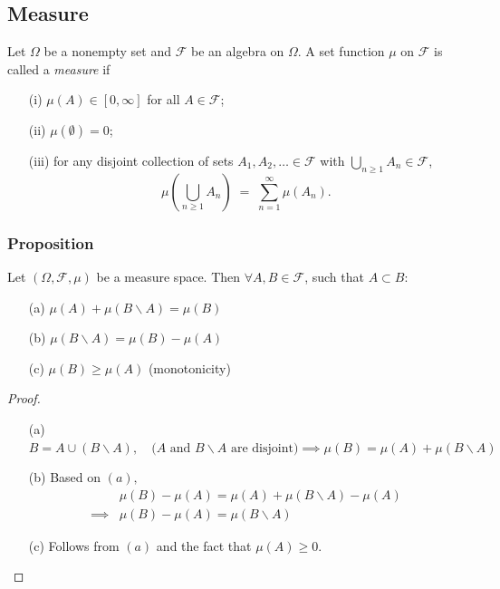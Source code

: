 \documentclass[11pt]{article}
\theoremstyle{definition}
\begin{document}
    \subsection{Measure}
    \label{subsec:measures:measure}
    Let $\Omega$ be a nonempty set and $\mathcal{F}$ be an algebra on $\Omega$.
    A set function $\mu$ on $\mathcal{F}$ is called a \emph{measure} if
    \begin{enumerate}[label=(\alph*)]
      \item [(i)] $\mu(A) \in [0,\infty]$ for all $A \in \mathcal{F}$;
      \item [(ii)] $\mu(\emptyset)=0$;
      \item [(iii)] for any disjoint collection of sets $A_1,A_2,\dots \in \mathcal{F}$ with $\bigcup_{n\ge 1} A_n \in \mathcal{F}$,
      \[
        \mu\!\left(\bigcup_{n\ge 1} A_n\right) \;=\; \sum_{n=1}^{\infty} \mu(A_n).
      \]
    \end{enumerate}
    
    \subsubsection{Proposition}
    \label{subsubsec:measures:measure:proposition-monotonicity}
    Let $(\Omega, \mathcal{F}, \mu)$ be a measure space. Then $\forall A, B \in \mathcal{F}$, such  that $A \subset B$:
    \begin{itemize}
        \item [(a)] $\mu(A) + \mu(B \backslash A) = \mu(B)$
        \item [(b)] $\mu(B \backslash A) = \mu(B) - \mu(A)$
        \item [(c)] $\mu(B) \geq \mu(A)$ (monotonicity)
    \end{itemize} 
    \begin{proof}
    \begin{itemize}
        \item [(a)] $B = A \cup (B \backslash A), \quad \text{($A$ and $B \backslash A$ are disjoint)} \implies \mu(B) = \mu(A) + \mu(B \backslash A)$
        \item [(b)] Based on $(a),$ 
        \begin{align*}
            & \mu(B) - \mu(A) = \mu(A) + \mu(B \backslash A) - \mu(A) \\
            \implies & \mu(B) - \mu(A) = \mu(B \backslash A)
        \end{align*}
        \item [(c)] Follows from $(a)$ and the fact that $\mu(A) \geq 0.$
    \end{itemize}
    \end{proof}
    
\end{document}
